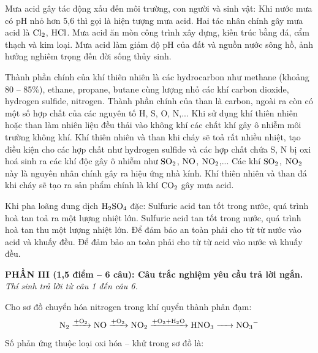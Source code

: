 \documentclass[12pt,a4paper]{article}
\begin{document}
\begin{ex}
Mưa acid gây tác động xấu đến môi trường, con người và sinh vật:
\choiceTF
{Khi nước mưa có pH nhỏ hơn 5,6 thì gọi là hiện tượng mưa acid.}
{Hai tác nhân chính gây mưa acid là $\ce{Cl2}$, $\ce{HCl}$.}
{Mưa acid ăn mòn công trình xây dựng, kiến trúc bằng đá, cẩm thạch và kim loại.}
{Mưa acid làm giảm độ pH của đất và nguồn nước sông hồ, ảnh hưởng nghiêm trọng đến đời sống thủy sinh.}
\loigiai{}
\end{ex}

\begin{ex}
Thành phần chính của khí thiên nhiên là các hydrocarbon như methane (khoảng 80 -- 85\%), ethane, propane, butane cùng lượng nhỏ các khí carbon dioxide, hydrogen sulfide, nitrogen. Thành phần chính của than là carbon, ngoài ra còn có một số hợp chất của các nguyên tố H, S, O, N,...
\choiceTF
{Khi sử dụng khí thiên nhiên hoặc than làm nhiên liệu đều thải vào không khí các chất khí gây ô nhiễm môi trường không khí.}
{Khí thiên nhiên và than khi cháy sẽ toả rất nhiều nhiệt, tạo điều kiện cho các hợp chất như hydrogen sulfide và các hợp chất chứa S, N bị oxi hoá sinh ra các khí độc gây ô nhiễm như $\ce{SO2}$, $\ce{NO}$, $\ce{NO2}$,...}
{Các khí $\ce{SO2}$, $\ce{NO2}$ này là nguyên nhân chính gây ra hiệu ứng nhà kính.}
{Khí thiên nhiên và than đá khi cháy sẽ tạo ra sản phẩm chính là khí $\ce{CO2}$ gây mưa acid.}
\loigiai{}
\end{ex}

\begin{ex}
Khi pha loãng dung dịch $\ce{H2SO4}$ đặc:
\choiceTF
{Sulfuric acid tan tốt trong nước, quá trình hoà tan toả ra một lượng nhiệt lớn.}
{Sulfuric acid tan tốt trong nước, quá trình hoà tan thu một lượng nhiệt lớn.}
{Để đảm bảo an toàn phải cho từ từ nước vào acid và khuấy đều.}
{Để đảm bảo an toàn phải cho từ từ acid vào nước và khuấy đều.}
\loigiai{}
\end{ex}

\bigskip
\noindent
\textbf{PHẦN III (1,5 điểm -- 6 câu): Câu trắc nghiệm yêu cầu trả lời ngắn.}\\
\textit{Thí sinh trả lời từ câu 1 đến câu 6.}

\begin{ex}
Cho sơ đồ chuyển hóa nitrogen trong khí quyển thành phân đạm:
\[\ce{N2 ->[+O2] NO ->[+O2] NO2 ->[+O2 + H2O] HNO3 -> NO3-}\]
Số phản ứng thuộc loại oxi hóa -- khử trong sơ đồ là:

\vspace{1.2cm}

\end{ex}
\end{document}
